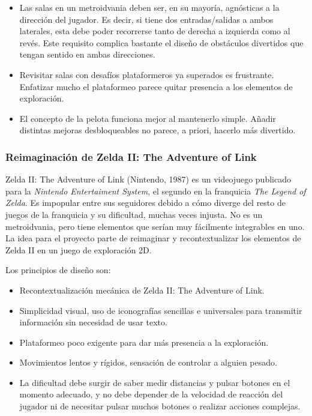 \begin{itemize}
    \item Las salas en un metroidvania deben ser, en su mayoría, agnósticas a la dirección del jugador. Es decir, si tiene dos entradas/salidas a ambos laterales, esta debe poder recorrerse tanto de derecha a izquierda como al revés. Este requisito complica bastante el diseño de obstáculos divertidos que tengan sentido en ambas direcciones.
    \item Revisitar salas con desafíos plataformeros ya superados es frustrante. Enfatizar mucho el plataformeo parece quitar presencia a los elementos de exploración.
    \item El concepto de la pelota funciona mejor al mantenerlo simple. Añadir distintas mejoras desbloqueables no parece, a priori, hacerlo más divertido.
\end{itemize}


\subsubsection{Reimaginación de Zelda II: The Adventure of Link}

Zelda II: The Adventure of Link (Nintendo, 1987) es un videojuego publicado para la \textit{Nintendo Entertaiment System}, el segundo en la franquicia \textit{The Legend of Zelda}. Es impopular entre sus seguidores debido a cómo diverge del resto de juegos de la franquicia y su dificultad, muchas veces injusta. No es un metroidvania, pero tiene elementos que serían muy fácilmente integrables en uno. La idea para el proyecto parte de reimaginar y recontextualizar los elementos de Zelda II en un juego de exploración 2D.

Los principios de diseño son:
\begin{itemize}
    \item Recontextualización mecánica de Zelda II: The Adventure of Link.
    \item Simplicidad visual, uso de iconografías sencillas e universales para transmitir información sin necesidad de usar texto.
    \item Plataformeo poco exigente para dar más presencia a la exploración.
    \item Movimientos lentos y rígidos, sensación de controlar a alguien pesado.
    \item La dificultad debe surgir de saber medir distancias y pulsar botones en el momento adecuado, y no debe depender de la velocidad de reacción del jugador ni de necesitar pulsar muchos botones o realizar acciones complejas.
\end{itemize}


